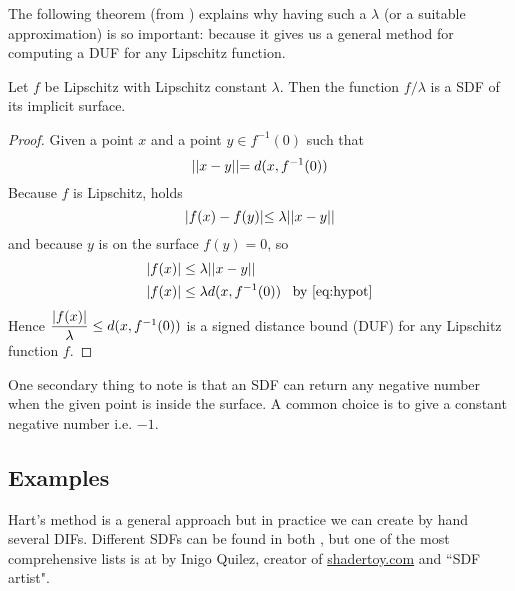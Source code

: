 The following theorem (from \cite{hart1996}) explains why having such a $\lambda$ (or a suitable approximation) is so important: because it gives us a general method for computing a DUF for any Lipschitz function.
\begin{theorem}
  Let $f$ be Lipschitz with Lipschitz constant $\lambda$.
  Then the function $f / \lambda$ is a SDF of its implicit surface.
\end{theorem}
\begin{proof}
  Given a point $x$ and a point $y \in f^{-1}(0)$ such that
  \begin{equation}
  \label{eq:hypot}
    \lvert\lvert x - y \lvert\lvert = d(x, f^{-1}(0))
  \end{equation}
  Because $f$ is Lipschitz, holds
  $$ \lvert f(x) - f(y) \lvert \leq \lambda \lvert\lvert x - y \lvert\lvert $$
  and because $y$ is on the surface $f(y) = 0$, so
  \begin{align*}
    \abs{f(x)} &\leq \lambda \norm{x - y} \\
    \abs{f(x)} &\leq \lambda d(x, f^{-1}(0)) \;\;\; \text{by \autoref{eq:hypot}}
  \end{align*}
  Hence
  $ \dfrac{\lvert f(x) \lvert}{\lambda} \leq d(x, f^{-1}(0)) $
  is a signed distance bound (DUF) for any Lipschitz function $f$.
\end{proof}
One secondary thing to note is that an SDF can return any negative number when the given point is inside the surface.
A common choice is to give a constant negative number i.e. $-1$.



\subsection{Examples}
Hart's method is a general approach but in practice we can create by hand several DIFs.
Different SDFs can be found in both \cite{hart1996,scratch_sdf}, but one of the most comprehensive lists is at \cite{iquilez_sdf} by Inigo Quilez, creator of \url{shadertoy.com}  and ``SDF artist".

